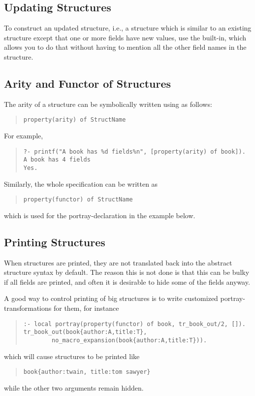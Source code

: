\subsection{Updating Structures}

To construct an updated structure, i.e., a structure which is similar
to an existing structure except that one or more fields have new
values, use the
built-in, which allows you to do that without having to mention all the
other field names in the structure.


\subsection{Arity and Functor of Structures}

The arity of a structure can be symbolically written using 
as follows:
\begin{quote}\begin{verbatim}
property(arity) of StructName
\end{verbatim}\end{quote}
For example,
\begin{quote}\begin{verbatim}
?- printf("A book has %d fields%n", [property(arity) of book]).
A book has 4 fields
Yes.
\end{verbatim}
\end{quote}
Similarly, the whole  specification can be written as
\begin{quote}
\begin{verbatim}
property(functor) of StructName
\end{verbatim}
\end{quote}
which is used for the portray-declaration in the example below.


\subsection{Printing Structures}
When structures are printed, they are not translated back into the
abstract structure syntax by default. The reason this is not done is that this
can
be bulky if all fields are printed, and often
it is desirable to hide some of the fields anyway.

A good way to control printing of big structures is to write customized
 portray-transformations for them, for instance
\begin{quote}
\begin{verbatim}
:- local portray(property(functor) of book, tr_book_out/2, []).
tr_book_out(book{author:A,title:T},
        no_macro_expansion(book{author:A,title:T})).
\end{verbatim}
\end{quote}
which will cause  structures to be printed like
\begin{quote}
\begin{verbatim}
book{author:twain, title:tom sawyer}
\end{verbatim}
\end{quote}
while the other two arguments remain hidden.

